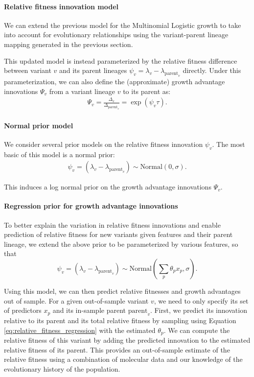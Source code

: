 \paragraph{Relative fitness innovation model}%

We can extend the previous model for the Multinomial Logistic growth to take into account for evolutionary relationships using the variant-parent lineage mapping generated in the previous section.

This updated model is instead parameterized by the relative fitness difference between variant $v$ and its parent lineages $\psi_{v} = \lambda_{v} - \lambda_{\text{parent}_{v}}$ directly.
Under this parameterization, we can also define the (approximate) growth advantage innovations $\Psi_{v}$ from a variant lineage $v$ to its parent as:
\begin{align*}
\Psi_{v} = \frac{\Delta_{v}}{\Delta_{\text{parent}_{v}}} = \exp(\psi_{v} \tau).
\end{align*}

\paragraph{Normal prior model}%

We consider several prior models on the relative fitness innovation $\psi_{v}$.
The most basic of this model is a normal prior:
\begin{align*}
    \psi_{v} = (\lambda_{v} - \lambda_{\text{parent}_{v}}) \sim \text{Normal}(0, \sigma).
\end{align*}

This induces a log normal prior on the growth advantage innovations $\Psi_{v}$.

\paragraph{Regression prior for growth advantage innovations}%

To better explain the variation in relative fitness innovations and enable prediction of relative fitness for new variants given features and their parent lineage, we extend the above prior to be parameterized by various features, so that
\begin{equation}\label{eq:relative_fitness_regression}
    \psi_{v} = (\lambda_{v} - \lambda_{\text{parent}_{v}}) \sim \text{Normal} \left( \sum_{p} \theta_{p} x_{p}, \sigma \right).
\end{equation}

Using this model, we can then predict relative fitnesses and growth advantages out of sample.
For a given out-of-sample variant $v$, we need to only specify its set of predictors $x_{p}$ and its in-sample parent $\text{parent}_v$.
First, we predict its innovation relative to its parent and its total relative fitness by sampling using Equation \ref{eq:relative_fitness_regression} with the estimated $\theta_{p}$.
We can compute the relative fitness of this variant by adding the predicted innovation to the estimated relative fitness of its parent.
This provides an out-of-sample estimate of the relative fitness using a combination of molecular data and our knowledge of the evolutionary history of the population.

